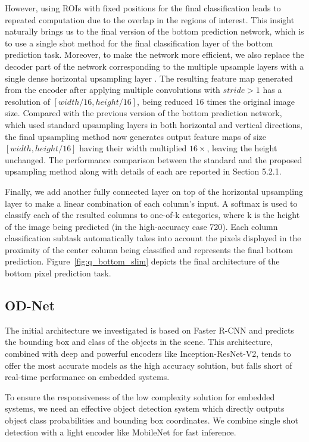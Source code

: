 \documentclass[10pt,twocolumn,letterpaper]{article}
\begin{document}
However, using ROIs with fixed positions for the final classification leads to repeated computation due to the overlap in the regions of interest. This insight naturally brings us to the final version of the bottom prediction network, which is to use a single shot method for the final classification layer of the bottom prediction task. Moreover, to make the network more efficient, we also replace the decoder part of the network corresponding to the multiple upsample layers with a single dense horizontal upsampling layer \cite{duc}. The resulting feature map generated from the encoder after applying multiple convolutions with $stride > 1$ has a resolution of $[width/16, height/16]$, being reduced 16 times the original image size. Compared with the previous version of the bottom prediction network, which used standard upsampling layers in both horizontal and vertical directions, the final upsampling method now generates output feature maps of size $[width, height/16]$ having their width multiplied $16\times$, leaving the height unchanged. The performance comparison between the standard and the proposed upsampling method along with details of each are reported in Section 5.2.1.

Finally, we add another fully connected layer on top of the horizontal upsampling layer to make a linear combination of each column's input. A softmax is used to classify each of the resulted columns to one-of-k categories, where k is the height of the image being predicted (in the high-accuracy case 720). Each column classification subtask automatically takes into account the pixels displayed in the proximity of the center column being classified and represents the final bottom prediction. Figure~\ref{fig:q_bottom_slim} depicts the final architecture of the bottom pixel prediction task.

\subsection{OD-Net}

The initial architecture we investigated is based on Faster R-CNN and predicts the bounding box and class of the objects in the scene. This architecture, combined with deep and powerful encoders like Inception-ResNet-V2, tends to offer the most accurate models as the high accuracy solution, but falls short of real-time performance on embedded systems.

To ensure the responsiveness of the low complexity solution for embedded systems, we need an effective object detection system which directly outputs object class probabilities and bounding box coordinates. We combine single shot detection with a light encoder like MobileNet for fast inference.
\end{document}
